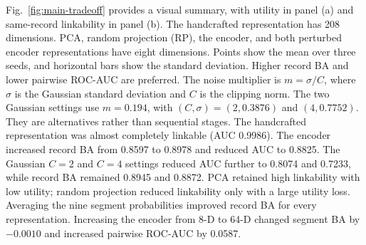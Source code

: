 \documentclass[journal]{IEEEtran}
\begin{document}
Fig.~\ref{fig:main-tradeoff} provides a visual summary, with utility in panel
(a) and same-record linkability in panel (b). The handcrafted representation
has 208 dimensions. PCA, random projection (RP), the encoder, and both perturbed
encoder representations have eight dimensions. Points show the mean over three
seeds, and horizontal bars show the standard deviation. Higher record BA and
lower pairwise ROC-AUC are preferred. The noise multiplier is
$m=\sigma/C$, where $\sigma$ is the Gaussian standard deviation and $C$ is the
clipping norm. The two Gaussian settings use $m=0.194$, with
$(C,\sigma)=(2,0.3876)$ and $(4,0.7752)$. They are alternatives rather than
sequential stages. The handcrafted representation was almost completely
linkable (AUC 0.9986). The encoder
increased record BA from 0.8597 to 0.8978 and reduced AUC to 0.8825. The
Gaussian $C=2$ and $C=4$ settings reduced AUC further to 0.8074 and 0.7233,
while record BA remained 0.8945 and 0.8872. PCA retained high linkability with
low utility; random projection reduced linkability only with a large utility
loss. Averaging the nine segment probabilities improved record BA for every
representation. Increasing the encoder from 8-D to 64-D changed segment BA by
$-0.0010$ and increased pairwise ROC-AUC by 0.0587.

\begin{table}[ht]
\centering
\scriptsize
\setlength{\tabcolsep}{2.5pt}
\caption{Sample-matched utility and linkability results.}
\label{tab:main-summary}
\end{table}
\end{document}
